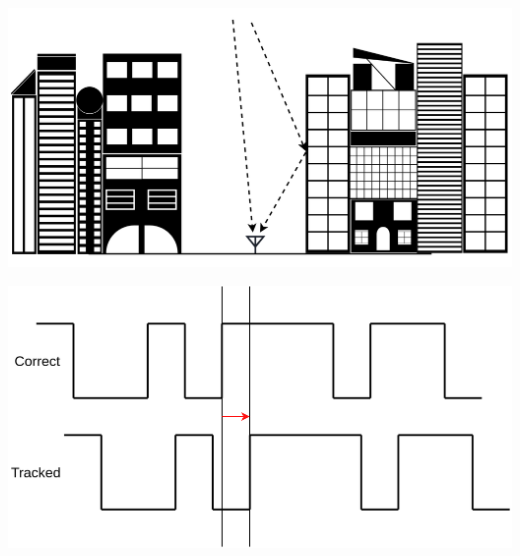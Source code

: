 \begin{minipage}{0.45\textwidth}
 \flushleft
 \includegraphics[width=\textwidth]{images/Multipath.png}
\end{minipage}
\hfill
\begin{minipage}{0.45\textwidth}
 \flushright
 \includegraphics[width=\textwidth]{images/Receiver_Noise.png}
\end{minipage}


